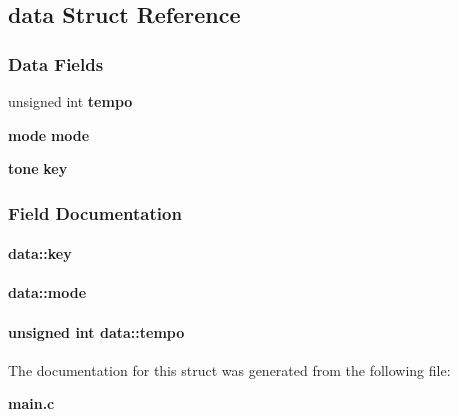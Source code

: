 \subsection{data Struct Reference}
\label{structdata}
\subsubsection*{Data Fields}
\begin{DoxyCompactItemize}
\item 
unsigned int {\bf tempo}
\item 
{\bf mode} {\bf mode}
\item 
{\bf tone} {\bf key}
\end{DoxyCompactItemize}


\subsubsection{Field Documentation}
\paragraph[{key}]{ data\+::key}\label{structdata_ae1a174f61aada93146a06764a3511eb6}
\paragraph[{mode}]{ data\+::mode}\label{structdata_a9781fc7b786289e4c06b4085d31558e3}
\paragraph[{tempo}]{\setlength{\rightskip}{0pt plus 5cm}unsigned int data\+::tempo}\label{structdata_a31232da79683035a6ff185f530da6c24}


The documentation for this struct was generated from the following file\+:\begin{DoxyCompactItemize}
\item 
{\bf main.\+c}\end{DoxyCompactItemize}

